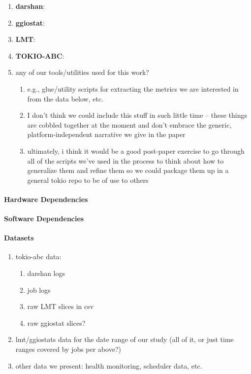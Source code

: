 \begin{enumerate}
	\item \textbf{darshan}:
    \item \textbf{ggiostat}:
    \item \textbf{LMT}:
    \item \textbf{TOKIO-ABC}:
    \item any of our tools/utilities used for this work?
	\begin{enumerate}
		\item e.g., glue/utility scripts for extracting the metrics we are interested in from the data below, etc.
		\item I don't think we could include this stuff in such little time -- these things are cobbled together at the moment and don't embrace the generic, platform-independent narrative we give in the paper
		\item ultimately, i think it would be a good post-paper exercise to go through all of the scripts we've used in the process to think about how to generalize them and refine them so we could package them up in a general tokio repo to be of use to others
	\end{enumerate}
\end{enumerate}

\paragraph{Hardware Dependencies}

\paragraph{Software Dependencies}

\paragraph{Datasets}

\begin{enumerate}
	\item tokio-abc data:
    \begin{enumerate}
        \item darshan logs
		\item job logs
        \item raw LMT slices in csv
        \item raw ggiostat slices?
    \end{enumerate}
	\item lmt/ggiostats data for the date range of our study (all of it, or just time ranges covered by jobs per above?)
    \item other data we present: health monitoring, scheduler data, etc.
\end{enumerate}

